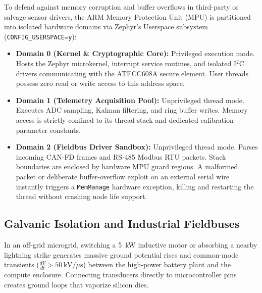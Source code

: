 To defend against memory corruption and buffer overflows in third-party or salvage sensor drivers, the ARM Memory Protection Unit (MPU) is partitioned into isolated hardware domains via Zephyr's Userspace subsystem (\texttt{CONFIG\_USERSPACE=y}):
\begin{itemize}
    \item \textbf{Domain 0 (Kernel \& Cryptographic Core):} Privileged execution mode. Hosts the Zephyr microkernel, interrupt service routines, and isolated I$^2$C drivers communicating with the ATECC608A secure element. User threads possess zero read or write access to this address space.
    \item \textbf{Domain 1 (Telemetry Acquisition Pool):} Unprivileged thread mode. Executes ADC sampling, Kalman filtering, and ring buffer writes. Memory access is strictly confined to its thread stack and dedicated calibration parameter constants.
    \item \textbf{Domain 2 (Fieldbus Driver Sandbox):} Unprivileged thread mode. Parses incoming CAN-FD frames and RS-485 Modbus RTU packets. Stack boundaries are enclosed by hardware MPU guard regions. A malformed packet or deliberate buffer-overflow exploit on an external serial wire instantly triggers a \texttt{MemManage} hardware exception, killing and restarting the thread without crashing node life support.
\end{itemize}

\subsection{Galvanic Isolation and Industrial Fieldbuses}

In an off-grid microgrid, switching a 5~kW inductive motor or absorbing a nearby lightning strike generates massive ground potential rises and common-mode transients ($\frac{dV}{dt} > 50\,\mathrm{kV}/\mu\mathrm{s}$) between the high-power battery plant and the compute enclosure. Connecting transducers directly to microcontroller pins creates ground loops that vaporize silicon dies.

